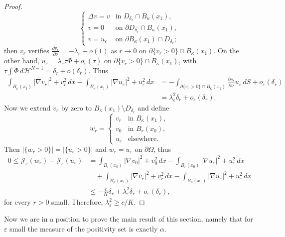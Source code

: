 \documentclass[11pt]{amsart}
\theoremstyle{definition}
\theoremstyle{remark}
\numberwithin{equation}{section}
\newcommand{\cH}{\mathcal{H}}
\newcommand{\cJ}{\mathcal{J}}
\begin{document}
\begin{proof}
\begin{equation}\label{42}
\begin{cases}
\Delta v=v & \text{in } D_{\delta_r}\cap B_\kappa(x_1),\\
v=0 & \text{on }\partial D_{\delta_r}\cap B_\kappa(x_1),\\
v=u_\varepsilon & \text{on }\partial B_\kappa(x_1)\cap D_{\delta_r};
\end{cases}
\end{equation}
then $v_r$ verifies $\frac{\partial v_r}{\partial\nu}=-\lambda_\varepsilon+o(1)$ as $r\to0$ on $\partial\{v_r>0\}\cap B_\kappa(x_1)$. On the other hand, $u_\varepsilon=\lambda_\varepsilon\tau\Phi+o_\varepsilon(\tau)$ on $\partial\{v_r>0\}\cap B_\kappa(x_1)$, with $\tau\int\Phi\,d\cH^{N-1}=\delta_r+o(\delta_r)$. Thus
\begin{align*}
\int_{B_\kappa(x_1)}|\nabla v_r|^2+v_r^2\,dx-\int_{B_\kappa(x_1)}|\nabla u_\varepsilon|^2+u_\varepsilon^2\,dx
&=-\int_{\partial\{v_r>0\}\cap B_\kappa(x_1)}\frac{\partial v_r}{\partial\nu}u_\varepsilon\,dS+o_\varepsilon(\delta_r)\\
&=\lambda_\varepsilon^2\delta_r+o_\varepsilon(\delta_r).
\end{align*}
Now we extend $v_r$ by zero to $B_\kappa(x_1)\setminus D_{\delta_r}$ and define
\[
w_r=\begin{cases}v_r & \text{in } B_\kappa(x_1),\\ v_0 & \text{in } B_r(x_0),\\ u_\varepsilon & \text{elsewhere}.\end{cases}
\]
Then $|\{w_r>0\}|=|\{u_\varepsilon>0\}|$ and $w_r=u_\varepsilon$ on $\partial\Omega$, thus
\[
\begin{aligned}
0\le\cJ_\varepsilon(w_r)-\cJ_\varepsilon(u_\varepsilon)&=\int_{B_r(x_0)}|\nabla v_0|^2+v_0^2\,dx-\int_{B_r(x_0)}|\nabla u_\varepsilon|^2+u_\varepsilon^2\,dx\\
&\quad+\int_{B_\kappa(x_1)}|\nabla v_r|^2+v_r^2\,dx-\int_{B_\kappa(x_1)}|\nabla u_\varepsilon|^2+u_\varepsilon^2\,dx\\
&\le-\frac cK\delta_r+\lambda_\varepsilon^2\delta_r+o_\varepsilon(\delta_r),
\end{aligned}
\]
for every $r>0$ small. Therefore, $\lambda_\varepsilon^2\ge c/K$.
\end{proof}

Now we are in a position to prove the main result of this section, namely that for $\varepsilon$ small the measure of the positivity set is exactly $\alpha$.
\end{document}

